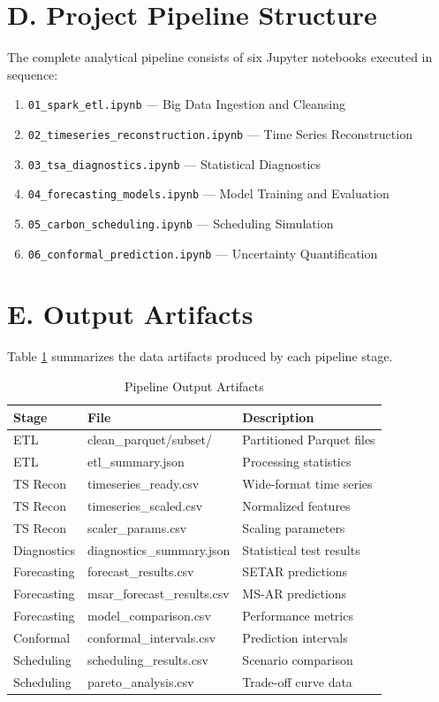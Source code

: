 \documentclass[12pt]{report}
\begin{document}
\section*{D. Project Pipeline Structure}

The complete analytical pipeline consists of six Jupyter notebooks executed in sequence:

\begin{enumerate}
    \item \texttt{01\_spark\_etl.ipynb} --- Big Data Ingestion and Cleansing
    \item \texttt{02\_timeseries\_reconstruction.ipynb} --- Time Series Reconstruction
    \item \texttt{03\_tsa\_diagnostics.ipynb} --- Statistical Diagnostics
    \item \texttt{04\_forecasting\_models.ipynb} --- Model Training and Evaluation
    \item \texttt{05\_carbon\_scheduling.ipynb} --- Scheduling Simulation
    \item \texttt{06\_conformal\_prediction.ipynb} --- Uncertainty Quantification
\end{enumerate}

\section*{E. Output Artifacts}

Table \ref{tab:outputs} summarizes the data artifacts produced by each pipeline stage.

\begin{table}[H]
\centering
\caption{Pipeline Output Artifacts}
\label{tab:outputs}
\begin{tabular}{lll}
\toprule
\textbf{Stage} & \textbf{File} & \textbf{Description} \\
\midrule
ETL & clean\_parquet/subset/ & Partitioned Parquet files \\
ETL & etl\_summary.json & Processing statistics \\
TS Recon & timeseries\_ready.csv & Wide-format time series \\
TS Recon & timeseries\_scaled.csv & Normalized features \\
TS Recon & scaler\_params.csv & Scaling parameters \\
Diagnostics & diagnostics\_summary.json & Statistical test results \\
Forecasting & forecast\_results.csv & SETAR predictions \\
Forecasting & msar\_forecast\_results.csv & MS-AR predictions \\
Forecasting & model\_comparison.csv & Performance metrics \\
Conformal & conformal\_intervals.csv & Prediction intervals \\
Scheduling & scheduling\_results.csv & Scenario comparison \\
Scheduling & pareto\_analysis.csv & Trade-off curve data \\
\bottomrule
\end{tabular}
\end{table}
\end{document}
